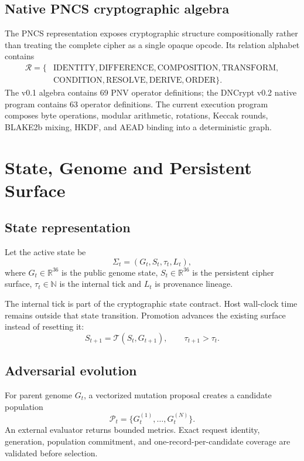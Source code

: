\section{Native PNCS cryptographic algebra}
The PNCS representation exposes cryptographic structure compositionally rather than treating the complete cipher as a single opaque opcode. Its relation alphabet contains
\begin{equation}
\begin{aligned}
\mathcal{R}=\{&\mathrm{IDENTITY},\mathrm{DIFFERENCE},\mathrm{COMPOSITION},\mathrm{TRANSFORM},\\
&\mathrm{CONDITION},\mathrm{RESOLVE},\mathrm{DERIVE},\mathrm{ORDER}\}.
\end{aligned}
\end{equation}
The v0.1 algebra contains 69 PNV operator definitions; the DNCrypt v0.2 native program contains 63 operator definitions. The current execution program composes byte operations, modular arithmetic, rotations, Keccak rounds, BLAKE2b mixing, HKDF, and AEAD binding into a deterministic graph.

\chapter[State, Genome and Persistent Surface]{State, Genome and Persistent\\Surface}
\section{State representation}
Let the active state be
\begin{equation}
\Sigma_t=(G_t,S_t,\tau_t,L_t),
\end{equation}
where $G_t\in\mathbb{R}^{36}$ is the public genome state, $S_t\in\mathbb{R}^{36}$ is the persistent cipher surface, $\tau_t\in\mathbb{N}$ is the internal tick and $L_t$ is provenance lineage.

The internal tick is part of the cryptographic state contract. Host wall-clock time remains outside that state transition. Promotion advances the existing surface instead of resetting it:
\begin{equation}
S_{t+1}=\mathcal{T}(S_t,G_{t+1}),\qquad \tau_{t+1}>\tau_t.
\end{equation}

\section{Adversarial evolution}
For parent genome $G_t$, a vectorized mutation proposal creates a candidate population
\begin{equation}
\mathcal{P}_t=\{G_t^{(1)},\ldots,G_t^{(N)}\}.
\end{equation}
An external evaluator returns bounded metrics. Exact request identity, generation, population commitment, and one-record-per-candidate coverage are validated before selection.

